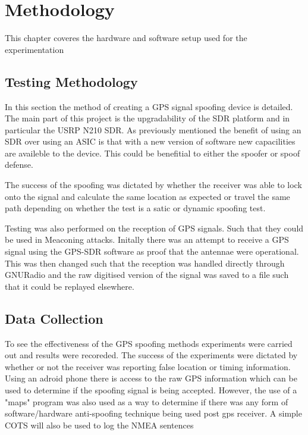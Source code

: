 \chapter{Methodology} %

\label{Chapter4} %

This chapter coveres the hardware and software setup used for the experimentation


\section{Testing Methodology}

In this section the method of creating a GPS signal spoofing device is detailed. The main part of this project is the upgradability of the SDR platform
and in particular the USRP N210 SDR. As previously mentioned the benefit of using an SDR over using an ASIC is that with a new version of software 
new capacilities are availeble to the device. This could be benefitial to either the spoofer or spoof defense. 

The success of the spoofing was dictated by whether the receiver was able to lock onto the signal and calculate the same location as expected or travel the same path
depending on whether the test is a satic or dynamic spoofing test. 

Testing was also performed on the reception of GPS signals. Such that they could be used in Meaconing attacks. Initally there was an attempt to receive a GPS signal using
the GPS-SDR software as proof that the antennae were operational. This was then changed such that the reception was handled directly through GNURadio and the raw
digitised version of the signal was saved to a file such that it could be replayed elsewhere.

\section{Data Collection}

To see the effectiveness of the GPS spoofing methods experiments were carried out and results were recoreded. The success of the experiments were dictated by whether or
not the receiver was reporting false location or timing information. Using an adroid phone there is access to the raw GPS information which can be used to determine if
the spoofing signal is being accepted. However, the use of a "maps" program was also used as a way to determine if there was any form of software/hardware anti-spoofing
technique being used post gps receiver. A simple COTS will also be used to log the NMEA sentences 

